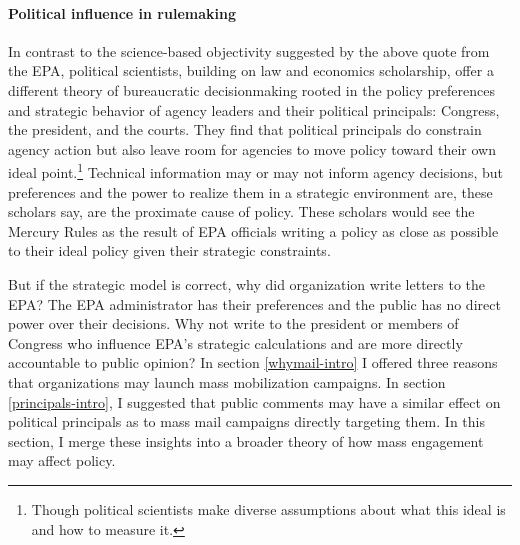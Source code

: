 
\paragraph{Political influence in rulemaking}
In contrast to the science-based objectivity suggested by the above quote from the EPA, political scientists, building on law and economics scholarship, offer a different theory of bureaucratic decisionmaking rooted in the policy preferences and strategic behavior of agency leaders and their political principals: Congress, the president, and the courts. They find that political principals do constrain agency action but also leave room for agencies to move policy toward their own ideal point.\footnote{Though political scientists make diverse assumptions about what this ideal is and how to measure it.} Technical information may or may not inform agency decisions, but preferences and the power to realize them in a strategic environment are, these scholars say, are the proximate cause of policy. These scholars would see the Mercury Rules as the result of EPA officials writing a policy as close as possible to their ideal policy given their strategic constraints.

But if the strategic model is correct, why did organization write letters to the EPA? The EPA administrator has their preferences and the public has no direct power over their decisions. Why not write to the president or members of Congress who influence EPA's strategic calculations and are more directly accountable to public opinion? In section \ref{whymail-intro} I offered three reasons that organizations may launch mass mobilization campaigns. In section \ref{principals-intro}, I suggested that public comments may have a similar effect on political principals as to mass mail campaigns directly targeting them. In this section, I merge these insights into a broader theory of how mass engagement may affect policy. 

